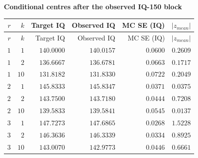 
\begingroup\small
\setlength{\tabcolsep}{4pt}
\noindent\textbf{Conditional centres after the observed IQ-150 block}
\begin{longtable}{rrrrrr}
\toprule
$r$ & $k$ & Target IQ & Observed IQ & MC SE (IQ) & $|z_{mean}|$ \\
\midrule
\endfirsthead
$r$ & $k$ & Target IQ & Observed IQ & MC SE (IQ) & $|z_{mean}|$ \\
\midrule
\endhead
\bottomrule
\endfoot
$1$ & $1$ & $140.0000$ & $140.0157$ & $0.0600$ & $0.2609$ \\
$1$ & $2$ & $136.6667$ & $136.6781$ & $0.0663$ & $0.1717$ \\
$1$ & $10$ & $131.8182$ & $131.8330$ & $0.0722$ & $0.2049$ \\
$2$ & $1$ & $145.8333$ & $145.8347$ & $0.0371$ & $0.0375$ \\
$2$ & $2$ & $143.7500$ & $143.7180$ & $0.0444$ & $0.7208$ \\
$2$ & $10$ & $139.5833$ & $139.5841$ & $0.0545$ & $0.0137$ \\
$3$ & $1$ & $147.7273$ & $147.6865$ & $0.0268$ & $1.5228$ \\
$3$ & $2$ & $146.3636$ & $146.3339$ & $0.0334$ & $0.8925$ \\
$3$ & $10$ & $143.0070$ & $142.9773$ & $0.0446$ & $0.6661$ \\
\end{longtable}
\endgroup

